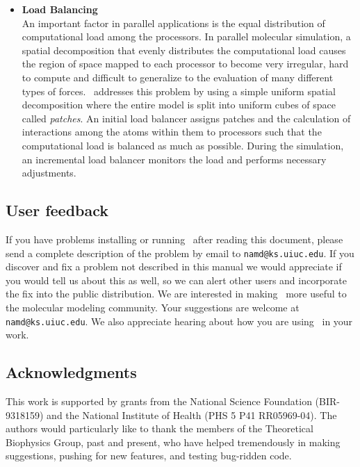 \begin{itemize}
\item{\bf Load Balancing}\\
An important factor in parallel applications is the equal distribution
of computational load among the processors. In parallel molecular simulation,
a spatial decomposition that evenly distributes the computational load
causes the region of space mapped to each processor to become very irregular, 
hard to compute and difficult to generalize to the evaluation of many different
types of forces.  \NAMD\ addresses this problem by using a simple uniform 
spatial decomposition where the entire model is split into uniform cubes of 
space called {\em patches}. An initial load balancer assigns patches
and the calculation of interactions among the atoms within them
to processors such that the computational load is balanced as much as possible.
During the simulation, an incremental load balancer monitors the load
and performs necessary adjustments.

\end{itemize}

\subsection{User feedback}

If you have problems installing or running \NAMD\ after
reading this document, please send a
complete description of the problem by email to {\tt namd@ks.uiuc.edu}.  If
you discover and fix a problem not described in this manual we would
appreciate if you would tell us about this as well, so we can alert
other users and incorporate the fix into the public distribution.
\prettypar
We are interested in making \NAMD\ more useful to the molecular modeling
community.  Your suggestions are welcome at {\tt namd@ks.uiuc.edu}.
We also appreciate hearing about how you are using \NAMD\ in your work.

\subsection{Acknowledgments}

This work is supported by grants from the National Science
Foundation (BIR-9318159) and the National Institute of Health 
(PHS 5 P41 RR05969-04).
\prettypar
The authors would particularly like to thank the members of the
Theoretical Biophysics Group, past and present, who have helped
tremendously in making suggestions, pushing for new features, and
testing bug-ridden code.

